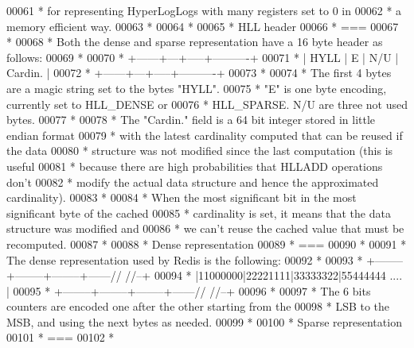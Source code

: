 \begin{DoxyCode}
00061 \textcolor{comment}{ *    for representing HyperLogLogs with many registers set to 0 in}
00062 \textcolor{comment}{ *    a memory efficient way.}
00063 \textcolor{comment}{ *}
00064 \textcolor{comment}{ *}
00065 \textcolor{comment}{ * HLL header}
00066 \textcolor{comment}{ * ===}
00067 \textcolor{comment}{ *}
00068 \textcolor{comment}{ * Both the dense and sparse representation have a 16 byte header as follows:}
00069 \textcolor{comment}{ *}
00070 \textcolor{comment}{ * +------+---+-----+----------+}
00071 \textcolor{comment}{ * | HYLL | E | N/U | Cardin.  |}
00072 \textcolor{comment}{ * +------+---+-----+----------+}
00073 \textcolor{comment}{ *}
00074 \textcolor{comment}{ * The first 4 bytes are a magic string set to the bytes "HYLL".}
00075 \textcolor{comment}{ * "E" is one byte encoding, currently set to HLL\_DENSE or}
00076 \textcolor{comment}{ * HLL\_SPARSE. N/U are three not used bytes.}
00077 \textcolor{comment}{ *}
00078 \textcolor{comment}{ * The "Cardin." field is a 64 bit integer stored in little endian format}
00079 \textcolor{comment}{ * with the latest cardinality computed that can be reused if the data}
00080 \textcolor{comment}{ * structure was not modified since the last computation (this is useful}
00081 \textcolor{comment}{ * because there are high probabilities that HLLADD operations don't}
00082 \textcolor{comment}{ * modify the actual data structure and hence the approximated cardinality).}
00083 \textcolor{comment}{ *}
00084 \textcolor{comment}{ * When the most significant bit in the most significant byte of the cached}
00085 \textcolor{comment}{ * cardinality is set, it means that the data structure was modified and}
00086 \textcolor{comment}{ * we can't reuse the cached value that must be recomputed.}
00087 \textcolor{comment}{ *}
00088 \textcolor{comment}{ * Dense representation}
00089 \textcolor{comment}{ * ===}
00090 \textcolor{comment}{ *}
00091 \textcolor{comment}{ * The dense representation used by Redis is the following:}
00092 \textcolor{comment}{ *}
00093 \textcolor{comment}{ * +--------+--------+--------+------//      //--+}
00094 \textcolor{comment}{ * |11000000|22221111|33333322|55444444 ....     |}
00095 \textcolor{comment}{ * +--------+--------+--------+------//      //--+}
00096 \textcolor{comment}{ *}
00097 \textcolor{comment}{ * The 6 bits counters are encoded one after the other starting from the}
00098 \textcolor{comment}{ * LSB to the MSB, and using the next bytes as needed.}
00099 \textcolor{comment}{ *}
00100 \textcolor{comment}{ * Sparse representation}
00101 \textcolor{comment}{ * ===}
00102 \textcolor{comment}{ *}

\end{DoxyCode}
